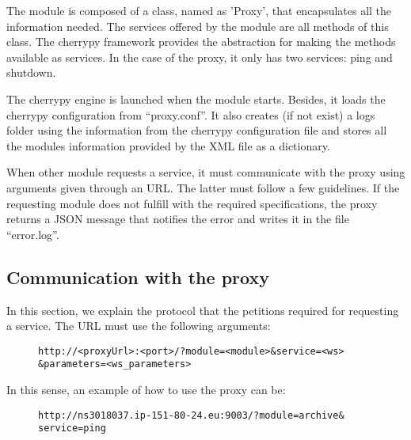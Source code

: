 The module is composed of a class, named as ’Proxy’, that encapsulates all the information needed. The services offered by the module are all methods of this class. The cherrypy framework provides the abstraction for making the methods available as services. In the case of the proxy, it only has two services: ping and shutdown.

The cherrypy engine is launched when the module starts. Besides, it loads the cherrypy configuration from “proxy.conf”. It also creates (if not exist) a logs folder using the information from the cherrypy configuration file and stores all the modules information provided by the XML file as a dictionary.

When other module requests a service, it must communicate with the proxy using arguments given through an URL. The latter must follow a few guidelines. If the requesting module does not fulfill with the required specifications, the proxy returns a JSON message that notifies the error and writes it in the file “error.log”.

\subsection{Communication with the proxy}

In this section, we explain the protocol that the petitions required for requesting a service. The URL must use the following arguments:

\begin{figure}[!ht]
\centering
\begin{verbatim}
http://<proxyUrl>:<port>/?module=<module>&service=<ws>
&parameters=<ws_parameters>
\end{verbatim}
\label{fi:url_protocol}
\end{figure}

In this sense, an example of how to use the proxy can be:

\begin{figure}[!ht]
\centering
\begin{verbatim}
http://ns3018037.ip-151-80-24.eu:9003/?module=archive&
service=ping
\end{verbatim}
\label{fi:url_ping_example}
\end{figure}

